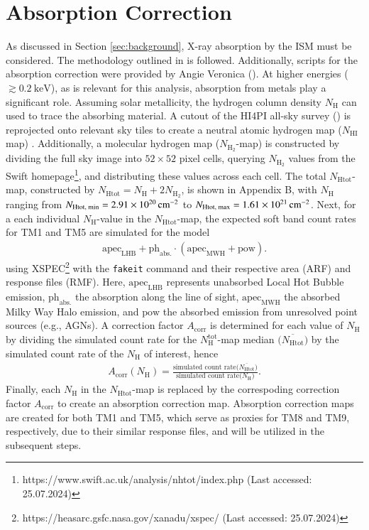 \section{Absorption Correction}
As discussed in Section \ref{sec:background}, X-ray absorption by the ISM must be considered. The methodology outlined in \cite{Willingale2013} is followed. Additionally, scripts for the absorption correction were provided by Angie Veronica (\cite{veronica2020}). At higher energies (\(\gtrsim \SI{0.2}{\kilo\electronvolt}\)), as is relevant for this analysis, absorption from metals play a significant role. 
Assuming solar metallicity, the hydrogen column density \(N_\text{H}\) can used to trace the absorbing material. A cutout of the HI4PI all-sky survey (\cite{HI4PI2016}) is reprojected onto relevant sky tiles to create a neutral atomic hydrogen map (\(N_{\text{HI}}\)map) . Additionally, a molecular hydrogen map (\(N_{\text{H}_2}\)-map) is constructed by dividing the full sky image into \(52 \times 52\) pixel cells, querying \(N_{\text{H}_2}\) values from the Swift homepage\footnote{https://www.swift.ac.uk/analysis/nhtot/index.php (Last accessed: 25.07.2024)}, and distributing these values across each cell. The total \(N_{\text{Htot}}\)-map, constructed by \(N_{\text{Htot}} = N_{\text{H}} + 2N_{\text{H}_2}\), is shown in Appendix B, with \(N_{\text{H}}\) ranging from \(N_\text{Htot, min} = \SI{2.91e+20}{{\centi\meter}^{-2}}\) to \(N_\text{Htot, max} = \SI{1.61e+21}{{\centi\meter}^{-2}}\).
Next, for a each individual \(N_{\text{H}}\)-value in the \(N_{\text{Htot}}\)-map, the expected soft band count rates for TM1 and TM5 are simulated for the model
\begin{align*}
    \text{apec}_{\text{LHB}} + \text{ph}_\text{abs.}\cdot(\text{apec}_{\text{MWH}} + \text{pow}).
\end{align*}
using XSPEC\footnote{https://heasarc.gsfc.nasa.gov/xanadu/xspec/ (Last accessed: 25.07.2024)} with the \texttt{fakeit} command and their respective area (ARF) and response files (RMF). Here, \(\text{apec}_{\text{LHB}}\) represents unabsorbed Local Hot Bubble emission, \(\text{ph}_\text{abs.}\) the absorption along the line of sight, \(\text{apec}_{\text{MWH}}\) the absorbed Milky Way Halo emission, and \(\text{pow}\) the absorbed emission from unresolved point sources (e.g., AGNs). A correction factor \(A_{\text{corr}}\) is determined for each value of \(N_\text{H}\) by dividing the simulated count rate for the \(N_{\text{H}}^{\text{tot}}\)-map median \(\bigl(\overline{N_{\text{Htot}}}\bigr)\) by the simulated count rate of the \(N_{\text{H}}\) of interest, hence
\begin{align*}
    A_{\text{corr}}(N_\text{H}) = \frac{\text{simulated count rate}\bigl(\overline{N_{\text{Htot}}}\bigr)}{\text{simulated count rate}\bigl(N_\text{H}\bigr)}.
\end{align*}
Finally, each \(N_\text{H}\) in the \(N_\text{Htot}\)-map is replaced by the correspoding correction factor \(A_\text{corr}\) to create an absorption correction map. Absorption correction maps are created for both TM1 and TM5, which serve as proxies for TM8 and TM9, respectively, due to their similar response files, and will be utilized in the subsequent steps.
